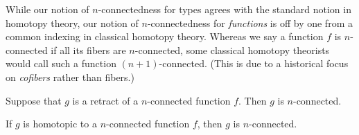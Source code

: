 \documentclass[hott-all.tex]{subfiles}
\begin{document}
% 
\begin{rmk}
  While our notion of $n$-connectedness for types agrees with the standard notion in homotopy theory, our notion of $n$-connectedness for \emph{functions} is off by one from a common indexing in classical homotopy theory.
  Whereas we say a function $f$ is $n$-connected if all its fibers are $n$-connected, some classical homotopy theorists would call such a function $(n+1)$-connected.
  (This is due to a historical focus on \emph{cofibers} rather than fibers.)
\end{rmk}
% 
% 
\begin{lem}
%
Suppose that $g$ is a retract of a $n$-connected function $f$.  Then $g$ is
$n$-connected.
\end{lem}
% 
\begin{cor}
If $g$ is homotopic to a $n$-connected function $f$, then $g$ is $n$-connected.
\end{cor}
% 
% 
% 
\end{document}
